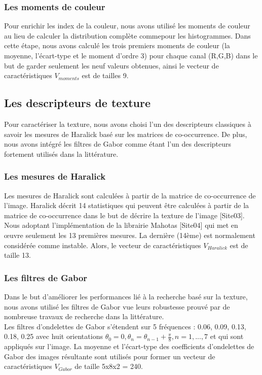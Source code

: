 \subsubsection{Les moments de couleur}
Pour enrichir les index de la couleur, nous avons utilisé les moments de couleur au lieu de calculer la distribution complète commepour les histogrammes. Dans cette étape, nous avons calculé les trois premiers moments de couleur (la moyenne, l’écart-type et le moment d'ordre 3) pour chaque canal (R,G,B) dans le but de garder seulement les neuf valeurs obtenues, ainsi le vecteur de caractéristiques $ V_{moments} $ est de tailles 9.

\subsection{Les descripteurs de texture}
Pour caractériser la texture, nous avons choisi l'un des descripteurs classiques à savoir les mesures de Haralick basé sur les matrices de co-occurrence. De plus, nous avons intégré les filtres de Gabor comme étant l'un des descripteurs fortement utilisés dans la littérature.
\subsubsection{Les mesures de Haralick}
Les mesures de Haralick sont calculées à partir de la matrice de co-occurrence de l'image. Haralick décrit 14 statistiques qui peuvent être calculées à partir de la matrice de co-occurrence dans le but de décrire la texture de l'image [Site03]. Nous adoptant l'implémentation de la librairie Mahotas [Site04] qui met en œuvre seulement les 13 premières mesures. La dernière (14ème) est normalement considérée comme instable. Alors, le vecteur de caractéristiques $ V_{Haralick} $ est de taille 13.

\subsubsection{Les filtres de Gabor}
Dans le but d'améliorer les performances lié à la recherche basé sur la texture, nous avons utilisé les filtres de Gabor vue leurs robustesse prouvé par de nombreuse travaux de recherche dans la littérature.\\

Les filtres d'ondelettes de Gabor s'étendent sur 5 fréquences : 0.06, 0.09, 0.13, 0.18, 0.25 avec huit orientations $ \theta_0 = 0, \theta_n = \theta_{n-1} + \frac{\pi}{8} , n = 1,...,7$  et qui sont appliqués sur l'image. La moyenne et l'écart-type des coefficients d'ondelettes de Gabor des images résultante sont utilisés pour former un vecteur de caractéristiques $ V_{Gabor} $ de taille 5x8x2 = 240.


